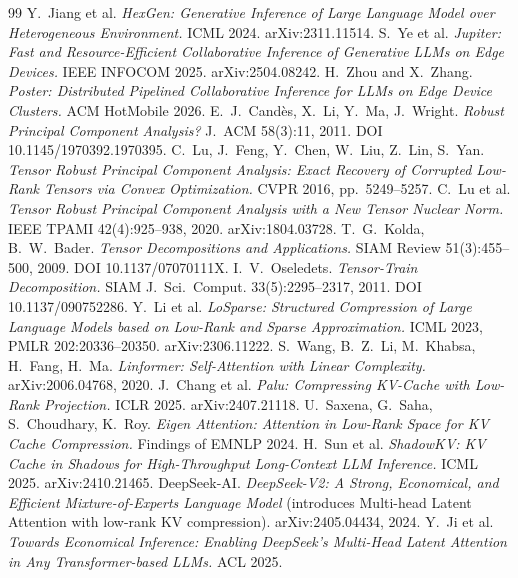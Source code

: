\documentclass[11pt]{article}
\begin{document}
\begin{thebibliography}{99}
\small
 Y.~Jiang et al. \emph{HexGen: Generative Inference of Large Language Model over Heterogeneous Environment.} ICML 2024. arXiv:2311.11514.
 S.~Ye et al. \emph{Jupiter: Fast and Resource-Efficient Collaborative Inference of Generative LLMs on Edge Devices.} IEEE INFOCOM 2025. arXiv:2504.08242.
 H.~Zhou and X.~Zhang. \emph{Poster: Distributed Pipelined Collaborative Inference for LLMs on Edge Device Clusters.} ACM HotMobile 2026.
 E.~J.~Cand\`es, X.~Li, Y.~Ma, J.~Wright. \emph{Robust Principal Component Analysis?} J.~ACM 58(3):11, 2011. DOI 10.1145/1970392.1970395.
 C.~Lu, J.~Feng, Y.~Chen, W.~Liu, Z.~Lin, S.~Yan. \emph{Tensor Robust Principal Component Analysis: Exact Recovery of Corrupted Low-Rank Tensors via Convex Optimization.} CVPR 2016, pp.~5249--5257.
 C.~Lu et al. \emph{Tensor Robust Principal Component Analysis with a New Tensor Nuclear Norm.} IEEE TPAMI 42(4):925--938, 2020. arXiv:1804.03728.
 T.~G.~Kolda, B.~W.~Bader. \emph{Tensor Decompositions and Applications.} SIAM Review 51(3):455--500, 2009. DOI 10.1137/07070111X.
 I.~V.~Oseledets. \emph{Tensor-Train Decomposition.} SIAM J.~Sci.~Comput. 33(5):2295--2317, 2011. DOI 10.1137/090752286.
 Y.~Li et al. \emph{LoSparse: Structured Compression of Large Language Models based on Low-Rank and Sparse Approximation.} ICML 2023, PMLR 202:20336--20350. arXiv:2306.11222.
 S.~Wang, B.~Z.~Li, M.~Khabsa, H.~Fang, H.~Ma. \emph{Linformer: Self-Attention with Linear Complexity.} arXiv:2006.04768, 2020.
 J.~Chang et al. \emph{Palu: Compressing KV-Cache with Low-Rank Projection.} ICLR 2025. arXiv:2407.21118.
 U.~Saxena, G.~Saha, S.~Choudhary, K.~Roy. \emph{Eigen Attention: Attention in Low-Rank Space for KV Cache Compression.} Findings of EMNLP 2024.
 H.~Sun et al. \emph{ShadowKV: KV Cache in Shadows for High-Throughput Long-Context LLM Inference.} ICML 2025. arXiv:2410.21465.
 DeepSeek-AI. \emph{DeepSeek-V2: A Strong, Economical, and Efficient Mixture-of-Experts Language Model} (introduces Multi-head Latent Attention with low-rank KV compression). arXiv:2405.04434, 2024.
 Y.~Ji et al. \emph{Towards Economical Inference: Enabling DeepSeek's Multi-Head Latent Attention in Any Transformer-based LLMs.} ACL 2025.

\end{thebibliography}
\end{document}
